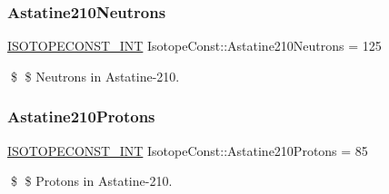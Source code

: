 \subsubsection{\texorpdfstring{Astatine210\+Neutrons}{Astatine210Neutrons}}
{\footnotesize\ttfamily \mbox{\hyperlink{group___isotope_const-_macros_ga5f18360b3e99483a35c32d789e62621c}{I\+S\+O\+T\+O\+P\+E\+C\+O\+N\+S\+T\+\_\+\+I\+NT}} Isotope\+Const\+::\+Astatine210\+Neutrons = 125}

\$ \$ Neutrons in Astatine-\/210. \mbox{\label{group___isotope_const-_astatine-_at210_gae4272fad98714e82851ae18be192ea65}} 
\subsubsection{\texorpdfstring{Astatine210\+Protons}{Astatine210Protons}}
{\footnotesize\ttfamily \mbox{\hyperlink{group___isotope_const-_macros_ga5f18360b3e99483a35c32d789e62621c}{I\+S\+O\+T\+O\+P\+E\+C\+O\+N\+S\+T\+\_\+\+I\+NT}} Isotope\+Const\+::\+Astatine210\+Protons = 85}

\$ \$ Protons in Astatine-\/210. 